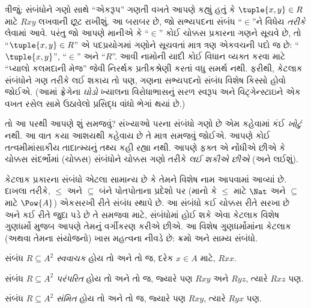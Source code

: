 ત્રીજું: સંબંધોને ગણો સાથે “એકરૂપ” ગણતી વખતે આપણે કહ્યું હતું
કે $\tuple{x,y} \in R$ માટે $Rxy$ લખવાની છૂટ રાખીશું.
આ બરાબર છે, જો સભ્યપદના સંબંધ “$\in$”ને વિધેય
\emph{તરીકે} લેવામાં આવે. પરંતુ જો આપણે માનીએ કે “$\in$”
કોઈ ચોક્કસ પ્રકારના ગણને સૂચવે છે, તો “$\tuple{x,y} \in R$”
એ પદપ્રયોગમાં ગણોને સૂચવતાં માત્ર ત્રણ એકવચની પદો જ છે:
“$\tuple{x,y}$”, “$\in$” અને “$R$”.
આવી નામોની યાદી કોઈ વિધાન વ્યક્ત કરવા માટે
“પ્યાલો કલમદાની મેજ” જેવી નિરર્થક પ્રતીકશ્રેણી કરતાં વધુ
સમર્થ નથી. ફરીથી, કેટલાક સંબંધોને ગણ તરીકે લઈ શકાય તો પણ,
ગણના સભ્યપદનો સંબંધ વિશેષ કિસ્સો હોવો જોઈએ.
(આમાં ફ્રેગેના \emph{ઘોડો} ખ્યાલના વિરોધાભાસનું સરળ સ્વરૂપ
અને વિટ્ગેન્સ્ટાઇને એક વખત રસેલ સામે ઉઠાવેલો પ્રસિદ્ધ વાંધો
ભેગાં થયાં છે.)

તો આ પરથી આપણે શું સમજવું? સંખ્યાઓ પરના સંબંધો ગણો છે એમ
કહેવામાં કંઈ \emph{ખોટું} નથી. આ વાત કયા આશયથી કહેવાય છે
તે માત્ર સમજવું જોઈએ. આપણે કોઈ તત્વમીમાંસાકીય તાદાત્મ્યનું
તથ્ય કહી રહ્યા નથી. આપણે ફક્ત એ નોંધીએ છીએ કે ચોક્કસ
સંદર્ભોમાં (ચોક્કસ) સંબંધોને ચોક્કસ ગણો તરીકે
\emph{લઈ શકીએ છીએ} (અને લઈશું).
\endgroup


\begingroup
\makeatletter{}\makeatother

\label{guunit:OLP-0014}


\begin{intro}
કેટલાક પ્રકારના સંબંધો એટલા સામાન્ય છે કે તેમને વિશેષ નામ
આપવામાં આવ્યાં છે. દાખલા તરીકે, $\le$ અને $\subseteq$ બંને
પોતપોતાના પ્રદેશો પર (માનો કે $\le$ માટે $\Nat$ અને
$\subseteq$ માટે $\Pow{A}$) એકસરખી રીતે સંબંધ સ્થાપે છે.
આ સંબંધો કઈ ચોક્કસ રીતે સરખા છે અને કઈ રીતે જુદા પડે છે તે
સમજવા માટે, સંબંધોમાં હોઈ શકે એવા કેટલાક વિશેષ ગુણધર્મો મુજબ
આપણે તેમનું વર્ગીકરણ કરીએ છીએ. આ વિશેષ ગુણધર્મોમાંના કેટલાક
(અથવા તેમના સંયોજનો) ખાસ મહત્વના નીવડે છે: ક્રમો અને સામ્ય સંબંધો.
\end{intro}

\begin{defn}[સ્વવાચકતા]
સંબંધ $R \subseteq A^2$ \emph{સ્વવાચક} હોય તો અને તો જ,
દરેક $x \in A$ માટે, $Rxx$.
\end{defn}

\begin{defn}[પરંપરિતતા]
સંબંધ $R \subseteq A^2$ \emph{પરંપરિત} હોય તો અને તો જ,
જ્યારે પણ $Rxy$ અને $Ryz$, ત્યારે $Rxz$ પણ.
\end{defn}

\begin{defn}[સંમિતતા]
સંબંધ $R \subseteq A^2$ \emph{સંમિત} હોય તો અને તો જ,
જ્યારે પણ $Rxy$, ત્યારે $Ryx$ પણ.
\end{defn}

